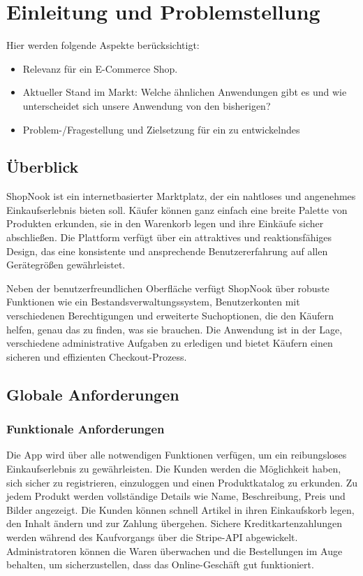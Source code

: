 \chapter{Einleitung und Problemstellung}


Hier werden folgende Aspekte berücksichtigt: 


\begin{itemize}
	\item Relevanz für ein E-Commerce Shop. 
	\item Aktueller Stand im Markt: Welche ähnlichen Anwendungen gibt es und wie unterscheidet sich unsere Anwendung von den bisherigen? 
	\item Problem-/Fragestellung und Zielsetzung für ein zu entwickelndes  
\end{itemize}

\section{Überblick}

ShopNook ist ein internetbasierter Marktplatz, der ein nahtloses und angenehmes Einkaufserlebnis bieten soll. Käufer können ganz einfach eine breite Palette von Produkten erkunden, sie in den Warenkorb legen und ihre Einkäufe sicher abschließen. Die Plattform verfügt über ein attraktives und reaktionsfähiges Design, das eine konsistente und ansprechende Benutzererfahrung auf allen Gerätegrößen gewährleistet.

Neben der benutzerfreundlichen Oberfläche verfügt ShopNook über robuste Funktionen wie ein Bestandsverwaltungssystem, Benutzerkonten mit verschiedenen Berechtigungen und erweiterte Suchoptionen, die den Käufern helfen, genau das zu finden, was sie brauchen. Die Anwendung ist in der Lage, verschiedene administrative Aufgaben zu erledigen und bietet Käufern einen sicheren und effizienten Checkout-Prozess.

\section{Globale Anforderungen}

\subsection{Funktionale Anforderungen}

Die App wird über alle notwendigen Funktionen verfügen, um ein reibungsloses Einkaufserlebnis zu gewährleisten. Die Kunden werden die Möglichkeit haben, sich sicher zu registrieren, einzuloggen und einen Produktkatalog zu erkunden. Zu jedem Produkt werden vollständige Details wie Name, Beschreibung, Preis und Bilder angezeigt. Die Kunden können schnell Artikel in ihren Einkaufskorb legen, den Inhalt ändern und zur Zahlung übergehen. Sichere Kreditkartenzahlungen werden während des Kaufvorgangs über die Stripe-API abgewickelt. Administratoren können die Waren überwachen und die Bestellungen im Auge behalten, um sicherzustellen, dass das Online-Geschäft gut funktioniert. 

